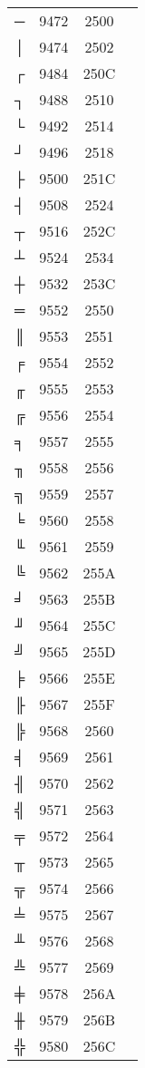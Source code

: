 \documentclass[10pt]{article}
\begin{document}
\begin{tabular}{crcl}
─&9472&2500&\\
│&9474&2502&\\
┌&9484&250C&\\
┐&9488&2510&\\
└&9492&2514&\\
┘&9496&2518&\\
├&9500&251C&\\
┤&9508&2524&\\
┬&9516&252C&\\
┴&9524&2534&\\
┼&9532&253C&\\
═&9552&2550&\\
║&9553&2551&\\
╒&9554&2552&\\
╓&9555&2553&\\
╔&9556&2554&\\
╕&9557&2555&\\
╖&9558&2556&\\
╗&9559&2557&\\
╘&9560&2558&\\
╙&9561&2559&\\
╚&9562&255A&\\
╛&9563&255B&\\
╜&9564&255C&\\
╝&9565&255D&\\
╞&9566&255E&\\
╟&9567&255F&\\
╠&9568&2560&\\
╡&9569&2561&\\
╢&9570&2562&\\
╣&9571&2563&\\
╤&9572&2564&\\
╥&9573&2565&\\
╦&9574&2566&\\
╧&9575&2567&\\
╨&9576&2568&\\
╩&9577&2569&\\
╪&9578&256A&\\
╫&9579&256B&\\
╬&9580&256C&\\
\end{tabular}
\end{document}
